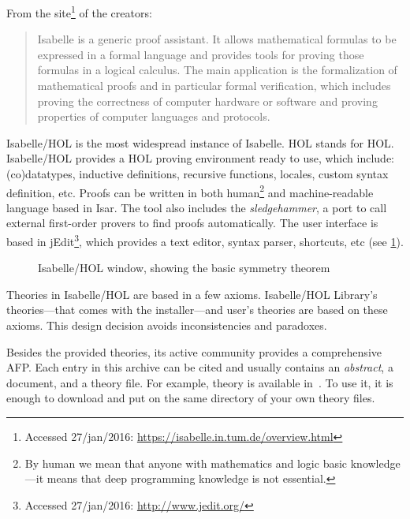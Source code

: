 %
\begin{isabellebody}%
%
%
\isadelimtheory
%
\endisadelimtheory
%
\isatagtheory
%
\endisatagtheory
{\isafoldtheory}%
%
\isadelimtheory
%
\endisadelimtheory
%
\begin{isamarkuptext}%
From the site\footnote{Accessed 27/jan/2016: \url{https://isabelle.in.tum.de/overview.html}} of the 
creators:
%
\begin{quote}
Isabelle is a generic proof assistant. It allows mathematical formulas to be expressed in a formal 
language and provides tools for proving those formulas in a logical calculus. 
%
The main application 
is the formalization of mathematical proofs and in particular formal verification, which includes 
proving the correctness of computer hardware or software and proving properties of computer 
languages and protocols.
\end{quote}%
\end{isamarkuptext}%
\isamarkuptrue%
%
\begin{isamarkuptext}%
Isabelle/HOL is the most widespread instance of Isabelle. 
\acs{HOL} stands for \acl{HOL}.
%
Isabelle/HOL provides a \ac{HOL} proving environment ready to use, which include: (co)datatypes, 
inductive definitions, recursive functions, locales, custom syntax definition, etc.
%
Proofs can be written in both human\footnote{By human we mean that anyone with mathematics and logic 
basic knowledge---it means that deep programming knowledge is not essential.} and machine-readable 
language based in \ac{Isar}.
%
The tool also includes the \emph{sledgehammer}, a port to call external first-order provers to find
proofs automatically.
%
The user interface is based in jEdit\footnote{Accessed 27/jan/2016: \url{http://www.jedit.org/}}, 
which provides a text editor, syntax parser, shortcuts, etc (see \cref{fig:basic-symmetry-isabelle-window}).

\begin{figure}[t]
  \centering
  \caption{Isabelle/HOL window, showing the basic symmetry theorem}
  \label{fig:basic-symmetry-isabelle-window}
\end{figure}

Theories in Isabelle/HOL are based in a few axioms.
%
Isabelle/HOL Library's theories---that comes with the installer---and user's theories are based on 
these axioms.
%
This design decision avoids inconsistencies and paradoxes.

Besides the provided theories, its active community provides a comprehensive \ac{AFP}.
%
Each entry in this archive can be cited and usually contains an \emph{abstract}, a document, and a 
theory file.
%
For example,  theory is available in~\cite{Huffm2010}.
%
To use it, it is enough to download and put on the same directory of your own theory files.


\end{isamarkuptext}
\end{isabellebody}
